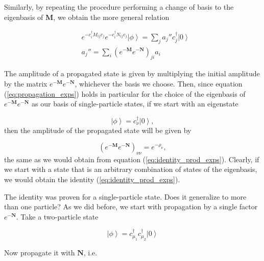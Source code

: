 Similarly, by repeating the procedure performing a change of basis to the eigenbasis of $\bm M$, we obtain the more general relation

\begin{equation}\label{eq:propagation_exps}
\begin{split}
&e^{-c_i^\dagger M_{ij} c_j} e^{-c_i^\dagger N_{ij} c_j} \left| \phi \right\rangle = \sum_j a_j'' c_j^\dagger \left| 0 \right\rangle \\
& a_j'' = \sum_i ( e^{-\bm M} e^{-\bm N} )_{ji} a_i
\end{split}
\end{equation}

The amplitude of a propagated state is given by multiplying the initial amplitude by the matrix $e^{-\bm M} e^{-\bm N}$, whichever the basis we choose. Then, since equation (\ref{eq:propagation_exps}) holds in particular for the choice of the eigenbasis of $e^{-\bm M}e^{-\bm N}$ as our basis of single-particle states, if we start with an eigenstate

\begin{equation}
\left| \phi \right\rangle = c_\nu^\dagger \left| 0 \right\rangle ,
\end{equation}
then the amplitude of the propagated state will be given by

\begin{equation}
(e^{-\bm M} e^{-\bm N} )_{\nu\nu} = e^{-\rho_\nu} ,
\end{equation}
the same as we would obtain from equation (\ref{eq:identity_prod_exps}). Clearly, if we start with a state that is an arbitrary combination of states of the eigenbasis, we would obtain the identity (\ref{eq:identity_prod_exps}).

The identity was proven for a single-particle state. Does it generalize to more than one particle? As we did before, we start with propagation by a single factor $e^{-\bm N}$. Take a two-particle state

\begin{equation}
\left| \phi \right\rangle = c_{\mu_1}^\dagger c_{\mu_2}^\dagger \left| 0 \right\rangle
\end{equation}

Now propagate it with $\bm N$, i.e. 

